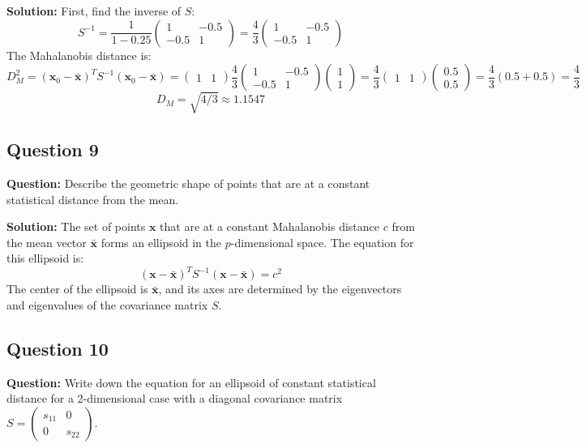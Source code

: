 \textbf{Solution:}
First, find the inverse of $S$:
$$ S^{-1} = \frac{1}{1-0.25} \begin{pmatrix} 1 & -0.5 \\ -0.5 & 1 \end{pmatrix} = \frac{4}{3} \begin{pmatrix} 1 & -0.5 \\ -0.5 & 1 \end{pmatrix} $$
The Mahalanobis distance is:
$$ D_M^2 = (\mathbf{x}_0-\bar{\mathbf{x}})^T S^{-1} (\mathbf{x}_0-\bar{\mathbf{x}}) = \begin{pmatrix} 1 & 1 \end{pmatrix} \frac{4}{3} \begin{pmatrix} 1 & -0.5 \\ -0.5 & 1 \end{pmatrix} \begin{pmatrix} 1 \\ 1 \end{pmatrix} = \frac{4}{3} \begin{pmatrix} 1 & 1 \end{pmatrix} \begin{pmatrix} 0.5 \\ 0.5 \end{pmatrix} = \frac{4}{3}(0.5+0.5) = \frac{4}{3} $$
$$ D_M = \sqrt{4/3} \approx 1.1547 $$

\subsection*{Question 9}
\textbf{Question:} Describe the geometric shape of points that are at a constant statistical distance from the mean.

\textbf{Solution:}
The set of points $\mathbf{x}$ that are at a constant Mahalanobis distance $c$ from the mean vector $\bar{\mathbf{x}}$ forms an ellipsoid in the $p$-dimensional space. The equation for this ellipsoid is:
$$ (\mathbf{x}-\bar{\mathbf{x}})^T S^{-1} (\mathbf{x}-\bar{\mathbf{x}}) = c^2 $$
The center of the ellipsoid is $\bar{\mathbf{x}}$, and its axes are determined by the eigenvectors and eigenvalues of the covariance matrix $S$.

\subsection*{Question 10}
\textbf{Question:} Write down the equation for an ellipsoid of constant statistical distance for a 2-dimensional case with a diagonal covariance matrix $S = \begin{pmatrix} s_{11} & 0 \\ 0 & s_{22} \end{pmatrix}$.

